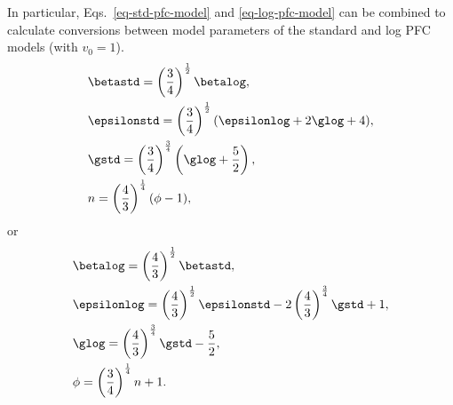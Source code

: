In particular, Eqs.~\ref{eq-std-pfc-model} and \ref{eq-log-pfc-model} can be combined to calculate conversions between model parameters of the standard and log PFC models (with $v_0 = 1$).
%
\begin{subequations}\label{eq-log-to-std-pfc-model-app}
\begin{align}
& \betastd = \left( \frac{3}{4} \right)^{\frac{1}{2}} \betalog, \label{eq-log-to-std-pfc-beta-app} \\
& \epsilonstd = \left( \frac{3}{4} \right)^{\frac{1}{2}}(\epsilonlog + 2 \glog + 4), \label{eq-log-to-std-pfc-epsilon-app} \\
& \gstd = \left( \frac{3}{4} \right)^{\frac{3}{4}} \left( \glog + \frac{5}{2} \right), \label{eq-log-to-std-pfc-g-app} \\
& n = \left( \frac{4}{3} \right)^{\frac{1}{4}}(\phi - 1), \label{eq-log-to-std-pfc-phi-app}
\end{align}
\end{subequations}
%
or
%
\begin{subequations}\label{eq-std-to-log-pfc-model-app}
\begin{align}
& \betalog = \left( \frac{4}{3} \right)^{\frac{1}{2}} \betastd, \label{eq-std-to-log-pfc-beta-app}  \\
& \epsilonlog = \left( \frac{4}{3} \right)^{\frac{1}{2}} \epsilonstd - 2 \left( \frac{4}{3} \right)^{\frac{3}{4}} \gstd + 1, \label{eq-std-to-log-pfc-epsilon-app} \\
& \glog = \left( \frac{4}{3} \right)^{\frac{3}{4}} \gstd - \frac{5}{2}, \label{eq-std-to-log-pfc-g-app} \\
& \phi = \left( \frac{3}{4} \right)^{\frac{1}{4}} n + 1. \label{eq-std-to-log-pfc-n-app}
\end{align}
\end{subequations}


